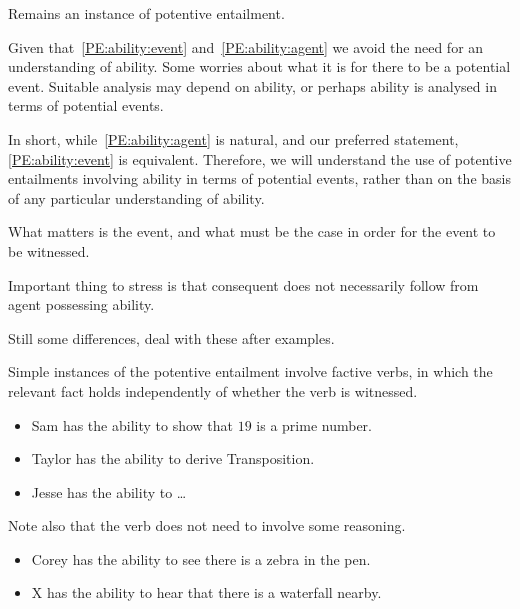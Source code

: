 \begin{note}
  Remains an instance of potentive entailment.

  Given that~\ref{PE:ability:event} and~\ref{PE:ability:agent} we avoid the need for an understanding of ability.
  Some worries about what it is for there to be a potential event.
  Suitable analysis may depend on ability, or perhaps ability is analysed in terms of potential events.

  In short, while~\ref{PE:ability:agent} is natural, and our preferred statement, \ref{PE:ability:event} is equivalent.
  Therefore, we will understand the use of potentive entailments involving ability in terms of potential events, rather than on the basis of any particular understanding of ability.

  What matters is the event, and what must be the case in order for the event to be witnessed.

  Important thing to stress is that consequent does not necessarily follow from agent possessing ability.

  Still some differences, deal with these after examples.
\end{note}

\begin{note}[Examples]
  Simple instances of the potentive entailment involve factive verbs, in which the relevant fact holds independently of whether the verb is witnessed.
  \begin{itemize}
  \item Sam has the ability to show that \(19\) is a prime number.
  \item Taylor has the ability to derive Transposition.
  \item Jesse has the ability to \dots
  \end{itemize}

  Note also that the verb does not need to involve some reasoning.
  \begin{itemize}
  \item Corey has the ability to see there is a zebra in the pen.
  \item X has the ability to hear that there is a waterfall nearby.
  \end{itemize}
\end{note}


